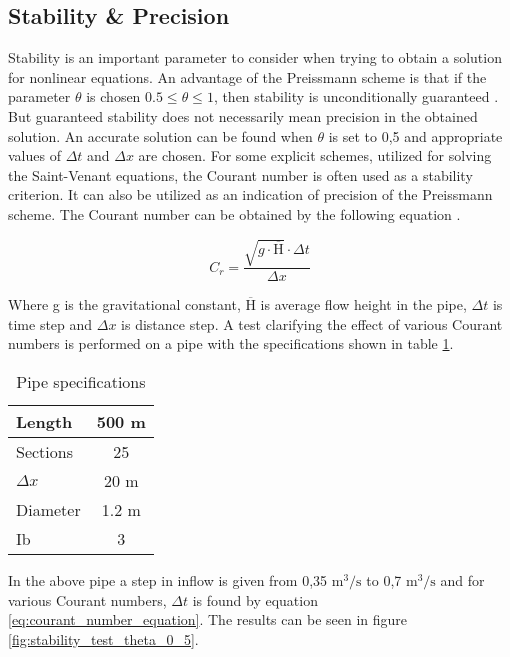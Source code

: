\subsection{Stability \& Precision} \label{subse:stability_and_precision}

Stability is an important parameter to consider when trying to obtain a solution for nonlinear equations. 
An advantage of the Preissmann scheme is that if the parameter $\theta$ is chosen $0.5 \leq \theta \leq 1$, then stability is unconditionally guaranteed \cite{cunge1980practical}. But guaranteed stability does not necessarily mean precision in the obtained solution. An accurate solution can be found when $\theta$ is set to 0,5 and appropriate values of $\Delta t$ and $\Delta x$ are chosen. For some explicit schemes, utilized for solving the Saint-Venant equations, the Courant number is often used as a stability criterion. It can also be utilized as an indication of precision of the Preissmann scheme. The Courant number can be obtained by the following equation \cite{cunge1980practical,szymkiewicz2010numerical}.

\begin{equation} \label{eq:courant_number_equation}
	C_r =  \frac{\sqrt{g \cdot \overline{\text{H}}} \cdot \Delta t}{\Delta x}
\end{equation}

Where g is the gravitational constant, $\overline{\text{H}}$ is average flow height in the pipe, $\Delta t$ is time step and $\Delta x$ is distance step. A test clarifying the effect of various Courant numbers is performed on a pipe with the specifications shown in table \ref{tab:pipe_stability_test}.

\begin{table}[H]
\centering
\begin{tabular}{|l|c|}  \hline
Length  	& 500 m \\ \hline
Sections 	& 25  	\\ \hline
$\Delta x$	& 20 m  \\ \hline
Diameter	& 1.2 m \\ \hline
Ib			& 3 \textperthousand \\ \hline
\end{tabular}
\caption{Pipe specifications}
\label{tab:pipe_stability_test}
\end{table}

In the above pipe a step in inflow is given from 0,35 $\text{m}^\text{3}/ \text{s}$ to 0,7 $\text{m}^\text{3}/ \text{s}$ and for various Courant numbers, $\Delta t$ is found by equation \ref{eq:courant_number_equation}. The results can be seen in figure \ref{fig:stability_test_theta_0_5}. 

